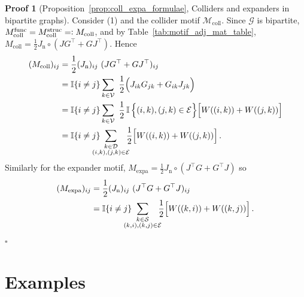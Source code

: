 \documentclass[12pt,draft]{ociamthesis}
\theoremstyle{plain}
\theoremstyle{definition}
\newtheorem{prf}{Proof}[chapter]
\theoremstyle{remark}
\newcommand\bb[1]{\mathbb{#1}}
\newcommand\ca[1]{\mathcal{#1}}
\begin{document}
\begin{prf}[Proposition~\ref{prop:coll_expa_formulae},
  Colliders and expanders in bipartite graphs]
  \label{proof:coll_expa_formulae}
  Consider (1) and the collider motif $\ca{M}_\mathrm{coll}$. Since $\ca{G}$ is
  bipartite, $M_\mathrm{coll}^\mathrm{func} = M_\mathrm{coll}^\mathrm{struc} =
  \vcentcolon M_\mathrm{coll}$, and by Table~\ref{tab:motif_adj_mat_table},
  $M_\mathrm{coll} = \frac{1}{2} J_\mathrm{n} \circ (J G^\top + G J^\top)$.
  Hence
  \begin{align*}
    (M_\mathrm{coll})_{i j} &= \frac{1}{2} (J_\mathrm{n})_{i j} \ (J G^\top + G
    J^\top)_{i j} \\
    &= \bb{I}\{i \neq j\} \sum_{k \in \ca{V}} \ \frac{1}{2} \Big(J_{i k} G_{j k}
    + G_{i k} J_{j k} \Big) \\
    &= \bb{I}\{i \neq j\} \sum_{k \in \ca{V}} \ \frac{1}{2} \,\bb{I} \, \Big\{
    (i,k),(j,k) \in \ca{E} \Big\} \Big[W((i,k)) + W((j,k))\Big] \\
    &= \bb{I} \{i \neq j\} \hspace*{-0.4cm} \sum_{\substack{k \in \ca{D} \\
    (i,k), (j,k) \in \ca{E}}} \hspace*{-0.2cm} \frac{1}{2} \Big[ W((i,k)) +
    W((j,k)) \Big]\,.
  \end{align*}
  Similarly for the expander motif, $M_\mathrm{expa} = \frac{1}{2} J_\mathrm{n}
  \circ (J^\top G + G^\top J)$ so
  \begin{align*}
    (M_\mathrm{expa})_{i j} &= \frac{1}{2} (J_\mathrm{n})_{i j} \ (J^\top G +
    G^\top J)_{i j} \\
    &= \bb{I} \{i \neq j\} \hspace*{-0.4cm} \sum_{\substack{k \in \ca{S} \\
    (k,i), (k,j) \in \ca{E}}} \hspace*{-0.2cm} \frac{1}{2} \Big[ W((k,i)) +
    W((k,j)) \Big]\,.
  \end{align*}
  \hfill $\square$
\end{prf}

\section{Examples}
\end{document}
